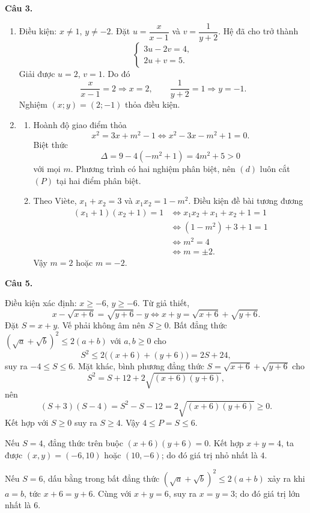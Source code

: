 \documentclass[12pt,a4paper]{article}
\begin{document}
\textbf{Câu 3.}
\begin{enumerate}[label=\alph*)]
\item Điều kiện: $x\ne1$, $y\ne-2$. Đặt $u=\dfrac{x}{x-1}$ và $v=\dfrac{1}{y+2}$. Hệ đã cho trở thành
\[
\begin{cases}3u-2v=4,\\2u+v=5.\end{cases}
\]
Giải được $u=2$, $v=1$. Do đó
\[
\frac{x}{x-1}=2\Rightarrow x=2,
\qquad
\frac{1}{y+2}=1\Rightarrow y=-1.
\]
Nghiệm $(x;y)=(2;-1)$ thỏa điều kiện.
\item
\begin{enumerate}[label=(\alph*)]
\item Hoành độ giao điểm thỏa
\[
x^2=3x+m^2-1\Longleftrightarrow x^2-3x-m^2+1=0.
\]
Biệt thức
\[
\Delta=9-4(-m^2+1)=4m^2+5>0
\]
với mọi $m$. Phương trình có hai nghiệm phân biệt, nên $(d)$ luôn cắt $(P)$ tại hai điểm phân biệt.
\item Theo Viète, $x_1+x_2=3$ và $x_1x_2=1-m^2$. Điều kiện đề bài tương đương
\begin{align*}
(x_1+1)(x_2+1)=1
&\Longleftrightarrow x_1x_2+x_1+x_2+1=1\\
&\Longleftrightarrow (1-m^2)+3+1=1\\
&\Longleftrightarrow m^2=4\\
&\Longleftrightarrow m=\pm2.
\end{align*}
Vậy $m=2$ hoặc $m=-2$.
\end{enumerate}
\end{enumerate}

\textbf{Câu 5.}

Điều kiện xác định: $x\ge-6$, $y\ge-6$. Từ giả thiết,
\[
x-\sqrt{x+6}=\sqrt{y+6}-y
\Longleftrightarrow x+y=\sqrt{x+6}+\sqrt{y+6}.
\]
Đặt $S=x+y$. Vế phải không âm nên $S\ge0$. Bất đẳng thức $(\sqrt a+\sqrt b)^2\le2(a+b)$ với $a,b\ge0$ cho
\[
S^2\le2\bigl((x+6)+(y+6)\bigr)=2S+24,
\]
suy ra $-4\le S\le6$. Mặt khác, bình phương đẳng thức $S=\sqrt{x+6}+\sqrt{y+6}$ cho
\[
S^2=S+12+2\sqrt{(x+6)(y+6)},
\]
nên
\[
(S+3)(S-4)=S^2-S-12=2\sqrt{(x+6)(y+6)}\ge0.
\]
Kết hợp với $S\ge0$ suy ra $S\ge4$. Vậy $4\le P=S\le6$.

Nếu $S=4$, đẳng thức trên buộc $(x+6)(y+6)=0$. Kết hợp $x+y=4$, ta được $(x,y)=(-6,10)$ hoặc $(10,-6)$; do đó giá trị nhỏ nhất là $4$.

Nếu $S=6$, dấu bằng trong bất đẳng thức $(\sqrt a+\sqrt b)^2\le2(a+b)$ xảy ra khi $a=b$, tức $x+6=y+6$. Cùng với $x+y=6$, suy ra $x=y=3$; do đó giá trị lớn nhất là $6$.
\end{document}
